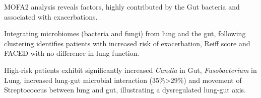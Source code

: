 MOFA2 analysis reveals factors, highly contributed by the Gut bacteria and associated with exacerbations. 

Integrating microbiomes (bacteria and fungi) from lung and the gut, following clustering identifies patients with increased risk of exacerbation, Reiff score and FACED with no difference in lung function. 

High-risk patients exhibit significantly increased \emph{Candia} in Gut, \emph{Fusobacterium} in Lung, increased lung-gut microbial interaction (35\%>29\%) and movement of Streptococcus between lung and gut, illustrating a dysregulated lung-gut axis.